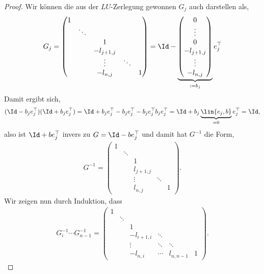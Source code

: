 \begin{proof}
Wir können die aus der $LU$-Zerlegung gewonnen $G_j$ auch darstellen als,
\begin{align*}
G_j=\begin{pmatrix}
  1 & & & & \\
   & \ddots & & &\\
    & & 1 & & \\
    & & -l_{j+1,j} &  & \\
    & & \vdots & \ddots & \\
    & & -l_{n,j} & & 1
  \end{pmatrix}
= \Id -
\underbrace{\begin{pmatrix}
0 \\  \vdots \\ 0 \\ -l_{j+1,j} \\ \vdots \\ -l_{n,j}
\end{pmatrix}}_{:=b_j}e_j^\top
\end{align*}
Damit ergibt sich,
\begin{align*}
(\Id - b_j e_j^\top)(\Id + b_je_j^\top) = \Id + b_j e_j^\top - b_je_j^\top -
b_je_j^\top b_je_j^\top = \Id + b_j\underbrace{\lin{e_j,b}}_{=0}e_j^\top
 = \Id,
\end{align*}
also ist $\Id + b e_j^\top$ invers zu $G=\Id - be_j^\top$ und damit hat $G^{-1}$
die Form,
\begin{align*}
G^{-1}=\begin{pmatrix}
  1 & & & & \\
    & \ddots & & &\\
    & & 1 & & \\
    & & l_{j+1,j} &  & \\
    & & \vdots & \ddots & \\
    & & l_{n,j} & & 1
  \end{pmatrix}.
\end{align*}
Wir zeigen nun durch Induktion, dass
\begin{align*}
G_i^{-1}\cdots G_{n-1}^{-1} = 
\begin{pmatrix}
  1 &  & & & \\
   & \ddots & & &\\
    & & 1 & & \\
    & & -l_{i+1,i} &  \ddots& \\
    & & \vdots & \ddots & \ddots & \\
    & & -l_{n,i} &\cdots & l_{n,n-1} & 1
  \end{pmatrix}.

\end{align*}
\end{proof}
